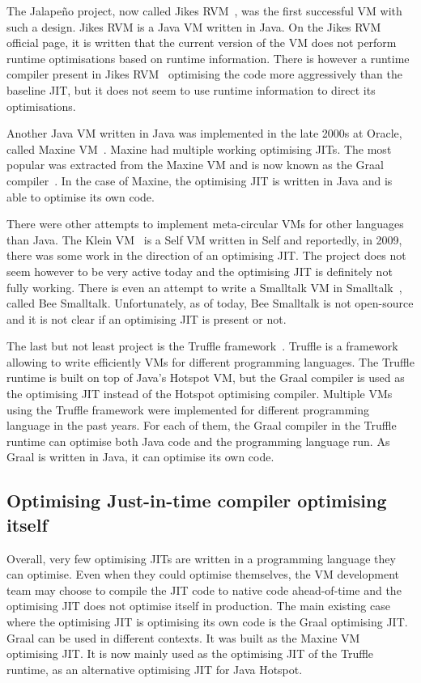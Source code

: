 \documentclass[a4paper,12pt,twoside]{../includes/ThesisStyle}
\begin{document}
The Jalape\~no project, now called Jikes RVM~\cite{Alp99a}, was the first successful VM with such a design. Jikes RVM is a Java VM written in Java. On the Jikes RVM official page, it is written that the current version of the VM does not perform runtime optimisations based on runtime information. There is however a runtime compiler present in Jikes RVM~\cite{Arn00} optimising the code more aggressively than the baseline JIT, but it does not seem to use runtime information to direct its optimisations. 


Another Java VM written in Java was implemented in the late 2000s at Oracle, called Maxine VM~\cite{Wimm13a}. Maxine had multiple working optimising JITs. The most popular was extracted from the Maxine VM and is now known as the Graal compiler~\cite{Oracle13,Dubo13c}. In the case of Maxine, the optimising JIT is written in Java and is able to optimise its own code.

There were other attempts to implement meta-circular VMs for other languages than Java. The Klein VM~\cite{Unga05b} is a Self VM written in Self and reportedly, in 2009, there was some work in the direction of an optimising JIT. The project does not seem however to be very active today and the optimising JIT is definitely not fully working. There is even an attempt to write a Smalltalk VM in Smalltalk~\cite{Pim14a}, called Bee Smalltalk. Unfortunately, as of today, Bee Smalltalk is not open-source and it is not clear if an optimising JIT is present or not.

The last but not least project is the Truffle framework~\cite{Wur13a}. Truffle is a framework allowing to write efficiently VMs for different programming languages. The Truffle runtime is built on top of Java's Hotspot VM, but the Graal compiler is used as the optimising JIT instead of the Hotspot optimising compiler. 
Multiple VMs using the Truffle framework were implemented for different programming language in the past years. For each of them, the Graal compiler in the Truffle runtime can optimise both Java code and the programming language run. As Graal is written in Java, it can optimise its own code.
 
\subsection{Optimising Just-in-time compiler optimising itself}

Overall, very few optimising JITs are written in a programming language they can optimise. Even when they could optimise themselves, the VM development team may choose to compile the JIT code to native code ahead-of-time and the optimising JIT does not optimise itself in production. The main existing case where the optimising JIT is optimising its own code is the Graal optimising JIT. Graal can be used in different contexts. It was built as the Maxine VM optimising JIT. It is now mainly used as the optimising JIT of the Truffle runtime, as an alternative optimising JIT for Java Hotspot.
\end{document}
